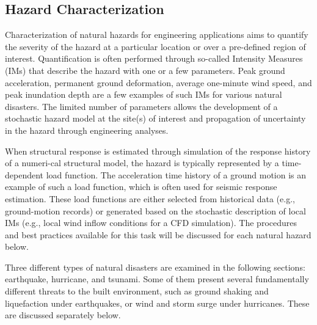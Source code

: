 
\begin{partbacktext}
\part{Hazard Characterization}

Characterization of natural hazards for engineering applications aims to quantify the severity of the hazard at a particular location or over a pre-defined region of interest. Quantification is often performed through so-called Intensity Measures (IMs) that describe the hazard with one or a few parameters. Peak ground acceleration, permanent ground deformation, average one-minute wind speed, and peak inundation depth are a few examples of such IMs for various natural disasters. The limited number of parameters allows the development of a stochastic hazard model at the site(s) of interest and propagation of uncertainty in the hazard through engineering analyses. 

When structural response is estimated through simulation of the response history of a numeri-cal structural model, the hazard is typically represented by a time-dependent load function. The acceleration time history of a ground motion is an example of such a load function, which is often used for seismic response estimation. These load functions are either selected from historical data (e.g., ground-motion records) or generated based on the stochastic description of local IMs (e.g., local wind inflow conditions for a CFD simulation). The procedures and best practices available for this task will be discussed for each natural hazard below.

Three different types of natural disasters are examined in the following sections: earthquake, hurricane, and tsunami. Some of them present several fundamentally different threats to the built environment, such as ground shaking and liquefaction under earthquakes, or wind and storm surge under hurricanes. These are discussed separately below. 

\end{partbacktext}